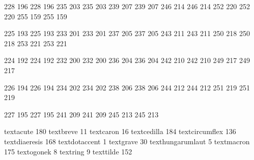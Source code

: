 
\startmapping[8r]

 228 196  228 196
 235 203  235 203
 239 207  239 207
 246 214  246 214
 252 220  252 220
 255 159  255 159

 225 193  225 193
 233 201  233 201
 237 205  237 205
 243 211  243 211
 250 218  250 218
 253 221  253 221

 224 192  224 192
 232 200  232 200
 236 204  236 204
 242 210  242 210
 249 217  249 217

 226 194  226 194
 234 202  234 202
 238 206  238 206
 244 212  244 212
 251 219  251 219

 227 195  227 195
 241 209  241 209
 245 213  245 213

\stopmapping

\startencoding[8r]

 textacute         180
 textbreve          11
 textcaron          16
 textcedilla       184
 textcircumflex    136
 textdiaeresis     168
 textdotaccent       1
 textgrave          30
 texthungarumlaut    5
 textmacron        175
 textogonek          8
 textring            9
 texttilde         152

